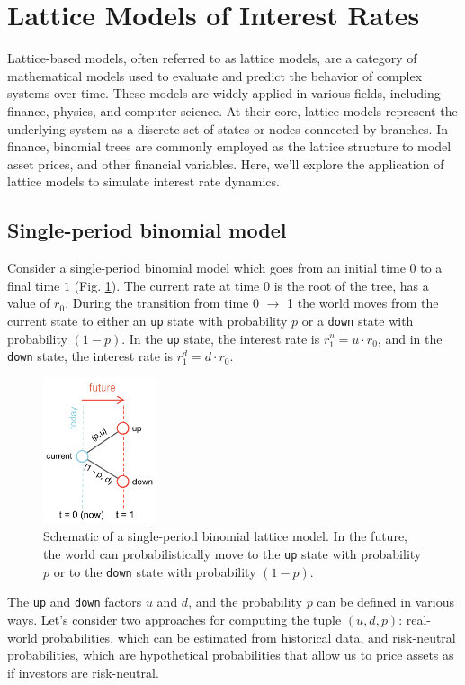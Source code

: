 \documentclass[11pt]{article}
\theoremstyle{definition}
\begin{document}
\clearpage

\section{Lattice Models of Interest Rates}
Lattice-based models, often referred to as lattice models, are a category of mathematical models used to evaluate and predict the behavior of complex systems over time. 
These models are widely applied in various fields, including finance, physics, and computer science. 
At their core, lattice models represent the underlying system as a discrete set of states or nodes connected by branches. 
In finance, binomial trees are commonly employed as the lattice structure to model asset prices, and other financial variables.
Here, we'll explore the application of lattice models to simulate interest rate dynamics. 

\subsection{Single-period binomial model}
Consider a single-period binomial model which goes from an initial time $0$ to a final time $1$ (Fig. \ref{fig:example-oneste-binomial-lattice-schematic}).
The current rate at time $0$ is the root of the tree, has a value of $r_{0}$.
During the transition from time 0 $\rightarrow$ 1 the world moves 
from the current state to either an \texttt{up} state with probability $p$ or a \texttt{down} state with probability $(1-p)$.
In the \texttt{up} state, the interest rate is $r_{1}^{u} = u\cdot{r_{0}}$, 
and in the \texttt{down} state, the interest rate is $r_{1}^{d} = d\cdot{r_{0}}$.
\begin{figure}[h]
    \centering
    \includegraphics[width=0.30\textwidth]{./figs/Fig-OneStep-Binomial-Lattice-Schematic.pdf}
    \caption{Schematic of a single-period binomial lattice model. 
	In the future, the world can probabilistically move to the \texttt{up} state with probability $p$ or to the \texttt{down} state with probability $(1-p)$. 
	}\label{fig:example-oneste-binomial-lattice-schematic}
\end{figure}
The \texttt{up} and \texttt{down} factors $u$ and $d$, and the probability $p$ can be defined in various ways.  
Let's consider two approaches for computing the tuple $(u,d,p)$: real-world probabilities, which can be estimated from historical data, and risk-neutral probabilities, 
which are hypothetical probabilities that allow us to price assets as if investors are risk-neutral. 
\end{document}
